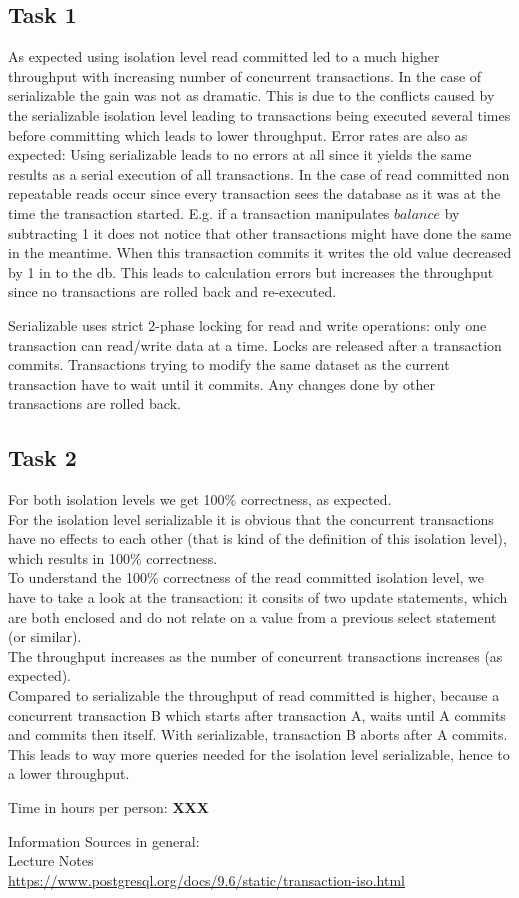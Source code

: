 \documentclass[11pt]{scrartcl}
\begin{document}
\subsection*{Task 1}
As expected using isolation level read committed led to a much higher throughput with increasing number of concurrent transactions. In the case of serializable the gain was not as dramatic. This is due to the conflicts caused by the serializable isolation level leading to transactions being executed several times before committing which leads to lower throughput.
Error rates are also as expected: Using serializable leads to no errors at all since it yields the same results as a serial execution of all transactions. In the case of read committed non repeatable reads occur since every transaction sees the database as it was at the time the transaction started. E.g. if a transaction manipulates $balance$ by subtracting 1 it does not notice that other transactions might have done the same in the meantime. When this transaction commits it writes the old value decreased by 1 in to the db. This leads to calculation errors but increases the throughput since no transactions are rolled back and re-executed.

Serializable uses strict 2-phase locking for read and write operations: only one transaction can read/write data at a time. Locks are released after a transaction commits. Transactions trying to modify the same dataset as the current transaction have to wait until it commits. Any changes done by other transactions are rolled back.

\subsection*{Task 2}

For both isolation levels we get 100\% correctness, as expected.\\
For the isolation level serializable it is obvious that the concurrent transactions have no effects to each other (that is kind of the definition of this isolation level), which results in 100\% correctness.\\
To understand the 100\% correctness of the read committed isolation level, we have to take a look at the transaction: it consits of two update statements, which are both enclosed and do not relate on a value from a previous select statement (or similar).\\
The throughput increases as the number of concurrent transactions increases (as expected).\\
Compared to serializable the throughput of read committed is higher, because a concurrent transaction B which starts after transaction A, waits until A commits and commits then itself. With serializable, transaction B aborts after A commits. This leads to way more queries needed for the isolation level serializable, hence to a lower throughput.


\bigskip

\noindent Time in hours per person: {\bf XXX}

\bigskip

Information Sources in general:\\
Lecture Notes\\
\url{https://www.postgresql.org/docs/9.6/static/transaction-iso.html}
\end{document}
